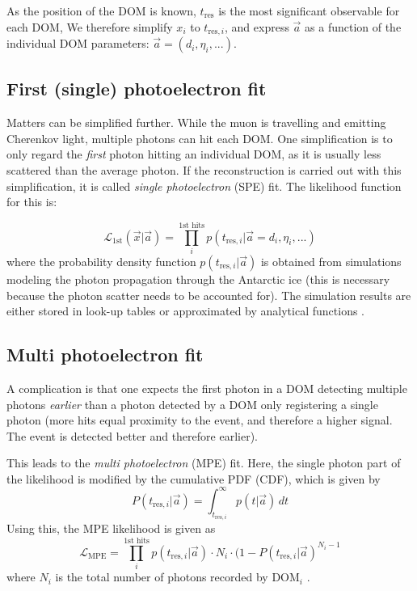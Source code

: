 As the position of the DOM is known, $t_\text{res}$ is the most significant observable for each DOM,  We therefore simplify $x_i$ to $t_{\text{res},i}$, and express $\vec{a}$ as a function of the individual DOM parameters: $\vec{a}= (d_i,\eta_i,...)$.



\subsection{First (single) photoelectron fit}
Matters can be simplified further. While the muon is travelling and emitting Cherenkov light, multiple photons can hit each DOM. One simplification is to only regard the \textit{first} photon hitting an individual DOM, as it is usually less scattered than the average photon. If the reconstruction is carried out with this simplification, it is called \textit{single photoelectron} (SPE) fit. The likelihood function for this is:

\begin{equation}
\mathcal{L}_\text{1st}(\vec{x}|\vec{a}) = \prod_i^\text{1st hits} p(t_{\text{res},i}|\vec{a}=d_i, \eta_i,...)
\end{equation}
where the probability density function $p(t_{\text{res},i}|\vec{a})$ is obtained from simulations modeling the photon propagation through the Antarctic ice (this is necessary because the photon scatter needs to be accounted for). The simulation results are either stored in look-up tables or approximated by analytical functions \cite{Ahrens2004}. 

\subsection{Multi photoelectron fit}
A complication is that one expects the first photon in a DOM detecting multiple photons \textit{earlier} than a photon detected by a DOM only registering a single photon (more hits equal proximity to the event, and therefore a higher signal. The event is detected better and therefore earlier). 

This leads to the \textit{multi photoelectron} (MPE) fit. Here, the single photon part of the likelihood is modified by the cumulative PDF (CDF), which is given by
\begin{equation}
P(t_{\text{res},i}|\vec{a}) = \int^{\infty}_{t_{\text{res},i}}p(t|\vec{a})\,dt
\end{equation}
Using this, the MPE likelihood is given as
\begin{equation}
\mathcal{L}_\text{MPE} = \prod_i^\text{1st hits} p(t_{\text{res},i}|\vec{a}) \cdot N_i \cdot (1-P(t_{\text{res},i}|\vec{a})^{N_i-1}
\end{equation}
where $N_i$ is the total number of photons recorded by $\text{DOM}_i$ \cite{Ahrens2004}.

